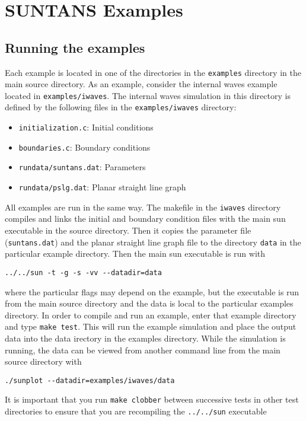 \section{SUNTANS Examples} \label{sec:examples}

\subsection{Running the examples}

Each example is located in one of the directories in the \verb+examples+ directory in
the main source directory.  As an example, consider the internal waves example located
in \verb+examples/iwaves+.  The internal waves simulation in this directory is defined by the following files
in the \verb+examples/iwaves+ directory:
\begin{itemize}
\item \verb+initialization.c+: Initial conditions
\item \verb+boundaries.c+: Boundary conditions
\item \verb+rundata/suntans.dat+: Parameters
\item \verb+rundata/pslg.dat+: Planar straight line graph
\end{itemize}
All examples are run in the same way.
The makefile in the \verb+iwaves+ directory compiles and links the initial and boundary condition
files with the main sun executable in the source directory.  Then it copies the parameter
file (\verb+suntans.dat+) and the planar straight line graph file to the directory \verb+data+ in
the particular example directory.  Then the main sun executable is run with
\begin{verbatim}
../../sun -t -g -s -vv --datadir=data
\end{verbatim}
where the particular flags may depend on the example, but the executable is run from
the main source directory and the data is local to the particular examples directory.
In order to compile and run an example, enter that example
directory and type \verb+make test+.  This will run the example simulation and place
the output data into the data irectory in the examples directory.
While the simulation is running, the data can be viewed from another command line
from the main source directory with
\begin{verbatim}
./sunplot --datadir=examples/iwaves/data
\end{verbatim}
It is important that you run \verb+make clobber+ between successive tests in other
test directories to ensure that you are recompiling the \verb+../../sun+ executable
